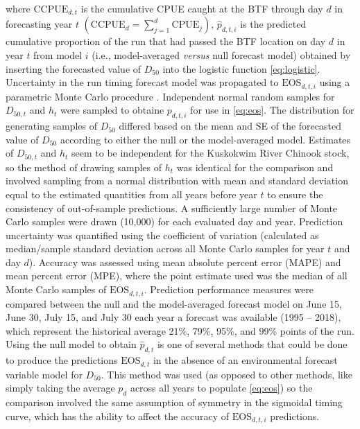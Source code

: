 \documentclass[12pt,]{book}
\theoremstyle{definition}
\theoremstyle{definition}
\theoremstyle{definition}
\theoremstyle{remark}
\begin{document}
\noindent
where \(\text{CCPUE}_{d,t}\) is the cumulative CPUE caught at the BTF
through day \(d\) in forecasting year \(t\)
\(\left(\text{CCPUE}_d = \sum_{j=1}^{d} \text{CPUE}_j \right)\),
\(\hat{p}_{d,t,i}\) is the predicted cumulative proportion of the run
that had passed the BTF location on day \(d\) in year \(t\) from model
\(i\) (i.e., model-averaged \emph{versus} null forecast model) obtained
by inserting the forecasted value of \(D_{50}\) into the logistic
function \eqref{eq:logistic}. Uncertainty in the run timing forecast model
was propagated to \(\text{EOS}_{d,t,i}\) using a parametric Monte Carlo
procedure \citep{bolker-2008}. Independent normal random samples for
\(D_{50,t}\) and \(h_t\) were sampled to obtaine \(p_{d,t,i}\) for use
in \eqref{eq:eos}. The distribution for generating samples of \(D_{50}\)
differed based on the mean and SE of the forecasted value of \(D_{50}\)
according to either the null or the model-averaged model. Estimates of
\(D_{50,t}\) and \(h_t\) seem to be independent for the Kuskokwim River
Chinook stock, so the method of drawing samples of \(h_t\) was identical
for the comparison and involved sampling from a normal distribution with
mean and standard deviation equal to the estimated quantities from all
years before year \(t\) to ensure the consistency of out-of-sample
predictions. A sufficiently large number of Monte Carlo samples were
drawn (10,000) for each evaluated day and year. Prediction uncertainty
was quantified using the coefficient of variation (calculated as
median/sample standard deviation across all Monte Carlo samples for year
\(t\) and day \(d\)). Accuracy was assessed using mean absolute percent
error (MAPE) and mean percent error (MPE), where the point estimate used
was the median of all Monte Carlo samples of \(\text{EOS}_{d,t,i}\).
Prediction performance measures were compared between the null and the
model-averaged forecast model on June 15, June 30, July 15, and July 30
each year a forecast was available (1995 -- 2018), which represent the
historical average 21\%, 79\%, 95\%, and 99\% points of the run. Using
the null model to obtain \(\hat{p}_{d,t}\) is one of several methods
that could be done to produce the predictions \(\text{EOS}_{d,t}\) in
the absence of an environmental forecast variable model for \(D_{50}\).
This method was used (as opposed to other methods, like simply taking
the average \(p_d\) across all years to populate \eqref{eq:eos}) so the
comparison involved the same assumption of symmetry in the sigmoidal
timing curve, which has the ability to affect the accuracy of
\(\text{EOS}_{d,t,i}\) predictions.
\end{document}
